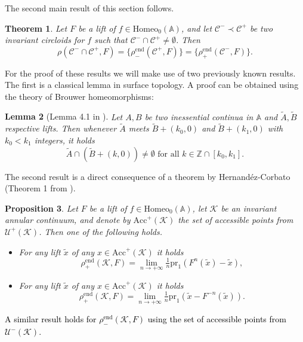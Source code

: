 \documentclass[12pt,a4paper]{amsart}
\newtheorem{thm}{Theorem}[section]
\newtheorem{lemma}[thm]{Lemma}
\newtheorem{prop}[thm]{Proposition}
\theoremstyle{definition}
\theoremstyle{remark}
\newcommand{\Z}{\mathbb{Z}}
\newcommand{\A}{\mathbb{A}}
\begin{document}
The second main result of this section follows.

 \begin{thm}\label{t.inter}
Let $F$ be a lift of $f\in\mathrm{Homeo}_0(\A)$,  and let $\mathcal{C}^-\prec\mathcal{C}^+$ be two invariant circloids for $f$ 
such that $\mathcal{C}^-\cap\mathcal{C}^+\neq\emptyset$. Then
\[
\rho(\mathcal{C}^-\cap \mathcal{C}^+,F)
=
\{\rho^{\mathrm{end}}_-(\mathcal{C}^+,F)\}
=
\{\rho^{\mathrm{end}}_+(\mathcal{C}^-,F)\}.
\]
\end{thm}


For the proof of these results we will make use of two previously known results. The first is a classical lemma in surface topology. A proof can be obtained using the theory of Brouwer homeomorphisms:

\begin{lemma}[Lemma 4.1 in \cite{koropass}]\label{l.intersectioncontinua}
Let $A,B$ be two inessential continua in $\A$ and $\tilde{A},\tilde{B}$ respective lifts.
Then whenever $\tilde{A}$ meets $\tilde{B}+(k_0,0)$ and $\tilde{B}+(k_1,0)$
with $k_0<k_1$ integers, it holds
$$\tilde{A}\cap\left(\tilde{B}+(k,0)\right)\not =\emptyset \mbox{ for all }k\in\Z\cap[k_0,k_1].$$
\end{lemma}

The second result is a direct consequence of a theorem by Hernand\'ez-Corbato (Theorem 1 from \cite{paperluis}).

\begin{prop}\label{propluis}
Let $F$ be a lift of $f\in\mathrm{Homeo}_0(\A)$, let $\mathcal{K}$ be an invariant annular continuum, and denote by 
$\mathrm{Acc}^+(\mathcal{K})$ the set of accessible points from $\mathcal{U}^{+}(\mathcal{K})$. 
Then one of the following holds.
\begin{itemize}
\item[(a)] For any lift $\tilde{x}$ of any $x\in \mathrm{Acc}^+(\mathcal{K})$ it holds
$$\rho^{\mathrm{end}}_+(\mathcal{K},F)=\lim_{n\to+\infty}\tfrac{1}{n}\mathrm{pr}_1\left(F^n(\widetilde x)-\widetilde x\right),$$
\item[(b)]  For any lift $\tilde{x}$ of any $x\in \mathrm{Acc}^+(\mathcal{K})$ it holds
$$\rho^{\mathrm{end}}_+(\mathcal{K},F)=\lim_{n\to+\infty}\tfrac{1}{n}\mathrm{pr}_1\left(\widetilde x-F^{-n}(\widetilde x)\right).$$
\end{itemize}
\end{prop}
\textcolor{black}{A similar result holds for $\rho^{\mathrm{end}}_-(\mathcal{K},F)$ using the set of  accessible points from $\mathcal{U}^{-}(\mathcal{K})$.} 
\end{document}
